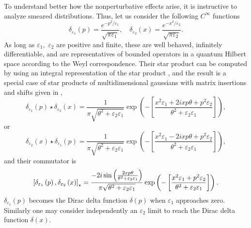 \documentclass[a4paper,12pt]{article}
\begin{document}
To understand better how the nonperturbative effects arise, it is
instructive to analyze smeared distributions. Thus, let us consider the
following $C^{\infty }$ functions
\begin{equation}
\delta _{\varepsilon _{1}}\left( p\right) =\frac{e^{-p^{2}/\varepsilon _{1}}%
}{\sqrt{\pi \varepsilon _{1}}},\quad \delta _{\varepsilon _{2}}\left(
x\right) =\frac{e^{-x^{2}/\varepsilon _{2}}}{\sqrt{\pi \varepsilon _{2}}}.
\end{equation}
As long as $\varepsilon _{1},$ $\varepsilon _{2}$ are positive and finite,
these are well behaved, infinitely differentiable, and are representatives
of bounded operators in a quantum Hilbert space according to the Weyl
correspondence. Their star product can be computed by using an integral
representation of the star product \cite{baker}\cite{curtright}, and the
result is a special case of star products of multidimensional gaussians with
matrix insertions and shifts given in \cite{witmoy},
\begin{equation}
\delta _{\varepsilon _{1}}\left( p\right) \star \delta _{\varepsilon
_{2}}\left( x\right) =\frac{1}{\pi \sqrt{\theta ^{2}+\varepsilon
_{2}\varepsilon _{1}}}\exp \left( -\left[ \frac{x^{2}\varepsilon
_{1}+2ixp\theta +p^{2}\varepsilon _{2}}{\theta ^{2}+\varepsilon
_{2}\varepsilon _{1}}\right] \right) ,
\end{equation}
or
\begin{equation}
\delta _{\varepsilon _{2}}\left( x\right) \star \delta _{\varepsilon
_{1}}\left( p\right) =\frac{1}{\pi \sqrt{\theta ^{2}+\varepsilon
_{2}\varepsilon _{1}}}\exp \left( -\left[ \frac{x^{2}\varepsilon
_{1}-2ixp\theta +p^{2}\varepsilon _{2}}{\theta ^{2}+\varepsilon
_{2}\varepsilon _{1}}\right] \right) ,
\end{equation}
and their commutator is
\begin{equation}
\left[ \delta _{\varepsilon _{1}}\left( p\right) ,\delta _{\varepsilon
_{2}}\left( x\right) \right] _{\star }=\frac{-2i\sin \left( \frac{2xp\theta
}{\theta ^{2}+\varepsilon _{2}\varepsilon _{1}}\right) }{\pi \sqrt{\theta
^{2}+\varepsilon _{2}\varepsilon _{1}}}\exp \left( -\left[ \frac{%
x^{2}\varepsilon _{1}+p^{2}\varepsilon _{2}}{\theta ^{2}+\varepsilon
_{2}\varepsilon _{1}}\right] \right) .
\end{equation}
$\delta _{\varepsilon _{1}}\left( p\right) $ becomes the Dirac delta
function $\delta \left( p\right) $ when $\varepsilon _{1}$ approaches zero.
Similarly one may consider independently an $\varepsilon _{2}$ limit to
reach the Dirac delta function $\delta \left( x\right) $.
\end{document}
